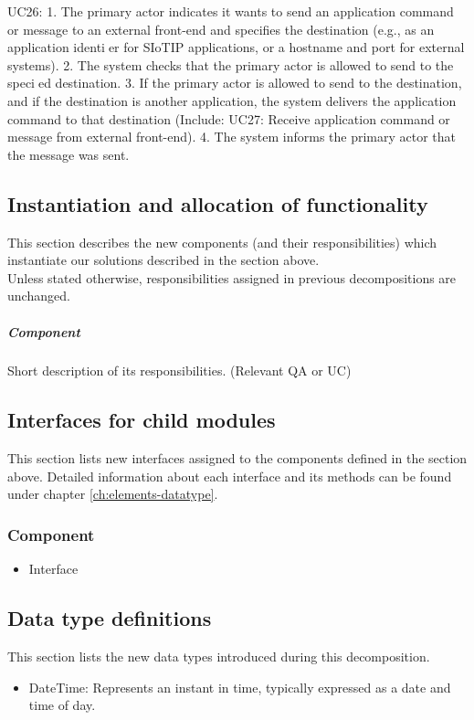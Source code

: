         UC26:
            1. The primary actor indicates it wants to send an application command or message to an external
                front-end and specifies the destination (e.g., as an application identier for SIoTIP applications,
                or a hostname and port for external systems).
            2. The system checks that the primary actor is allowed to send to the specied destination.
            3. If the primary actor is allowed to send to the destination, and if the destination is another
                application, the system delivers the application command to that destination (Include: UC27:
                Receive application command or message from external front-end).
            4. The system informs the primary actor that the message was sent.

        
\subsection{Instantiation and allocation of functionality}
    This section describes the new components (and their responsibilities)
    which instantiate our solutions described in the section above. \\
    Unless stated otherwise, responsibilities assigned in previous decompositions are unchanged.

    \subparagraph{Component}
        Short description of its responsibilities. (Relevant QA or UC)


\subsection{Interfaces for child modules}
    This section lists new interfaces assigned to the components defined
    in the section above. Detailed information about each interface and
    its methods can be found under chapter \ref{ch:elements-datatype}. \\

    \subsubsection{Component}
        \begin{itemize}
            \item Interface
        \end{itemize}

\subsection{Data type definitions}
    This section lists the new data types introduced during this decomposition.

    \begin{itemize}
        \item DateTime: Represents an instant in time, typically expressed as a date and time of day.
    \end{itemize}
